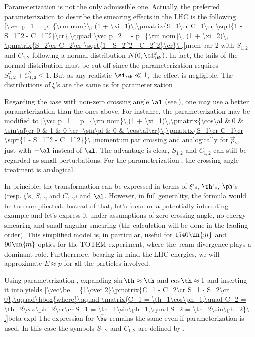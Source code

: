 Parameterization  is not the only admissible one. Actually, the preferred parameterization to describe the smearing effects in the LHC is the following
\eqref{\vec p_1 = p_{\rm nom}\, (1 + \xi_1)\,\pmatrix{S_1\cr C_1\cr \sqrt{1 - S_1^2 - C_1^2}\cr},\qquad \vec p_2 = - p_{\rm nom}\, (1 + \xi_2)\, \pmatrix{S_2\cr C_2\cr \sqrt{1 - S_2^2 - C_2^2}\cr}\ ,}{mom par 2}
with $S_{1,2}$ and $C_{1,2}$ following a normal distribution $N(0, \si_\th^2)$. In fact, the tails of the normal distribution must be cut off since the parameterization requires $S_{1,2}^2 + C_{1,2}^2 \leq 1$. But as any realistic $\si_\th \ll 1$, the effect is negligible. The distributions of $\xi$'s are the same as for parameterization .

Regarding the case with non-zero crossing angle $\al$ (see ), one may use a better parameterization than the ones above. For instance, the parameterization  may be modified to
\eqref{\vec p_1 = p_{\rm nom}\,(1 + \xi_1)\,\pmatrix{\cos\al & 0 & \sin\al\cr 0 & 1 & 0 \cr -\sin\al & 0 & \cos\al\cr}\,\pmatrix{S_1\cr C_1\cr \sqrt{1 - S_1^2 - C_1^2}}\.}{momentum par crossing}
and analogically for $\vec p_2$, just with $-\al$ instead of $\al$. The advantage is clear, $S_{1,2}$ and $C_{1,2}$ can still be regarded as small perturbations. For the parameterization , the crossing-angle treatment is analogical. 


In principle, the transformation  can be expressed in terms of $\xi$'s, $\th$'s, $\ph$'s (resp. $\xi$'s, $S_{1,2}$ and $C_{1,2}$) and $\al$. However, in full generality, the formula would be too complicated. Instead of that, let's focus on a potentially interesting example and let's express it under assumptions of zero crossing angle, no energy smearing and small angular smearing (the calculation will be done in the leading order). This simplified model is, in particular, useful for $1540\un{m}$ and $90\un{m}$ optics for the TOTEM experiment, where the beam divergence plays a dominant role. Furthermore, bearing in mind the LHC energies, we will approximate $E\approx p$ for all the particles involved.

Using parameterization , expanding $\sin\th\approx\th$ and $\cos\th\approx 1$ and inserting it into  yields
\eqref{\vec\be = {1\over 2}\pmatrix{C_1 - C_2\cr S_1 - S_2\cr 0},\qquad\hbox{where}\qquad \matrix{C_1 = \th_1\cos\ph_1,\quad C_2 = \th_2\cos\ph_2\cr\cr S_1 = \th_1\sin\ph_1,\quad S_2 = \th_2\sin\ph_2}\ .}{beta expl}
The expression for $\vec\be$ remains the same even if parameterization  is used. In this case the symbols $S_{1,2}$ and $C_{1,2}$ are defined by .

